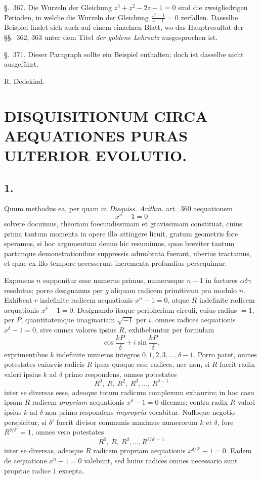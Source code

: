 \documentclass[12pt]{article}
\begin{document}
\S.~367. Die Wurzeln der Gleichung $z^3+z^2-2z-1=0$ sind die zweigliedrigen Perioden, in welche die Wurzeln der Gleichung $\frac{x^7-1}{x-1}=0$ zerfallen. Dasselbe Beispiel findet sich auch auf einem einzelnen Blatt, wo das Hauptresultat der \S\S.~362, 363 unter dem Titel \textit{der goldene Lehrsatz} ausgesprochen ist.

\S.~371. Dieser Paragraph sollte ein Beispiel enthalten; doch ist dasselbe nicht ausgeführt.

\begin{flushright}
R. Dedekind.
\end{flushright}


\clearpage
{}

\section*{DISQUISITIONUM CIRCA AEQUATIONES PURAS ULTERIOR EVOLUTIO.}

\subsection*{1.}

Quum methodus ea, per quam in \emph{Disquiss. Arithm.} art.~360 aequationem
\[
x^n-1=0
\]
solvere docuimus, theoriam foecundissimam et gravissimam constituat, cuius prima tantum momenta in opere illo attingere licuit, gratum geometris fore speramus, si hoc argumentum denuo hic resumimus, quae breviter tantum partimque demonstrationibus suppressis adumbrata fuerant, uberius tractamus, et quae ex illo tempore accesserunt incrementa profundius persequimur.

Exponens $n$ supponitur esse numerus primus, numerusque $n-1$ in factores $\alpha\delta\gamma$ resolutus; porro designamus per $g$ aliquam radicem primitivam pro modulo $n$. Exhibeat $r$ indefinite radicem aequationis $x^n-1=0$, atque $R$ indefinite radicem aequationis $x^\delta-1=0$. Designando itaque peripheriam circuli, cuius radius $=1$, per $P$, quantitatemque imaginariam $\sqrt{-1}$ per $i$, omnes radices aequationis $x^\delta-1=0$, sive omnes valores ipsius $R$, exhibebuntur per formulam
\[
\cos \frac{kP}{\delta}+i\sin\frac{kP}{\delta},
\]
exprimentibus $k$ indefinite numeros integros $0,1,2,3,\ldots,\delta-1$. Porro patet, omnes potestates cuiusvis radicis $R$ ipsas quoque esse radices, nec non, si $R$ fuerit radix valori ipsius $k$ ad $\delta$ primo respondens, omnes potestates
\[
R^0,\ R,\ R^2,\ R^3,\ldots,\ R^{\delta-1}
\]
inter se diversas esse, adeoque totum radicum complexum exhaurire; in hoc casu ipsam $R$ radicem \emph{propriam} aequationis $x^\delta-1=0$ dicemus; contra radix $R$ valori ipsius $k$ ad $\delta$ non primo respondens \emph{impropria} vocabitur. Nulloque negotio perspicitur, si $\delta'$ fuerit divisor communis maximus numerorum $k$ et $\delta$, fore $R^{\delta/\delta'}=1$, omnes vero potestates
\[
R^0,\ R,\ R^2,\ldots,R^{\delta/\delta'-1}
\]
inter se diversas, adeoque $R$ radicem propriam aequationis $x^{\delta/\delta'}-1=0$. Eadem de aequatione $x^n-1=0$ valebunt, sed huius radices omnes necessario sunt propriae radice $1$ excepta.
\end{document}

